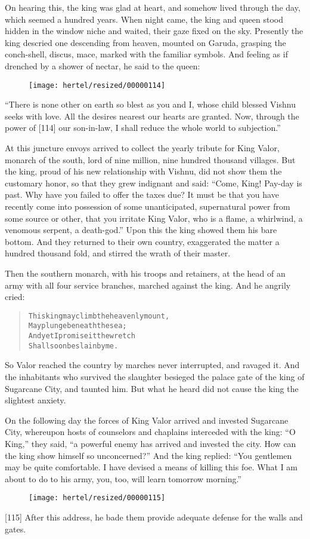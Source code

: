 \documentclass[article, twoside, 10pt]{memoir}
\renewenvironment{verbatim}{%
\begin{quote}%
\vskip -10pt%
\begin{alltt}\normalfont\small}{\end{alltt}%
\end{quote}%
\vskip -10pt
} %
\begin{document}
On hearing this, the king was glad at heart, and somehow lived
through the day, which seemed a hundred years. When night came, the
king and queen stood hidden in the window niche and waited, their
gaze fixed on the sky. Presently the king descried one descending
from heaven, mounted on Garuda, grasping the conch-shell, discus,
mace, marked with the familiar symbols. And feeling as if drenched
by a shower of nectar, he said to the queen:
\begin{figure}[p]\texttt{[image: hertel/resized/00000114]}\end{figure}``There is none other on earth so blest as you and I, whose child blessed Vishnu seeks with love. All the desires nearest our hearts are granted. Now, through the power of [114] our son-in-law, I shall reduce the whole world to subjection.''

At this juncture envoys arrived to collect the yearly tribute for
King Valor, monarch of the south, lord of nine million, nine
hundred thousand villages. But the king, proud of his new
relationship with Vishnu, did not show them the customary honor, so
that they grew indignant and said:
``Come, King! Pay-day is past. Why have you failed to offer the taxes due? It must be that you have recently come into possession of some unanticipated, supernatural power from some source or other, that you irritate King Valor, who is a flame, a whirlwind, a venomous serpent, a death-god.''
Upon this the king showed them his bare bottom. And they returned
to their own country, exaggerated the matter a hundred thousand
fold, and stirred the wrath of their master.

Then the southern monarch, with his troops and retainers, at the
head of an army with all four service branches, marched against the
king. And he angrily cried:

\begin{verbatim}
This king may climb the heavenly mount,
    May plunge beneath the sea;
And yet{\textemdash}I promise it{\textemdash}the wretch
    Shall soon be slain by me.
\end{verbatim}
So Valor reached the country by marches never interrupted, and
ravaged it. And the inhabitants who survived the slaughter besieged
the palace gate of the king of Sugarcane City, and taunted him. But
what he heard did not cause the king the slightest anxiety.

On the following day the forces of King Valor arrived and invested
Sugarcane City, whereupon hosts of counselors and chaplains
interceded with the king: ``O King,'' they said,
``a powerful enemy has arrived and invested the city. How can the king show himself so unconcerned?''
And the king replied:
``You gentlemen may be quite comfortable. I have devised a means of killing this foe. What I am about to do to his army, you, too, will learn tomorrow morning.''
\begin{figure}[p]\texttt{[image: hertel/resized/00000115]}\end{figure}[115] After this address, he bade them provide adequate defense for
the walls and gates.
\end{document}
